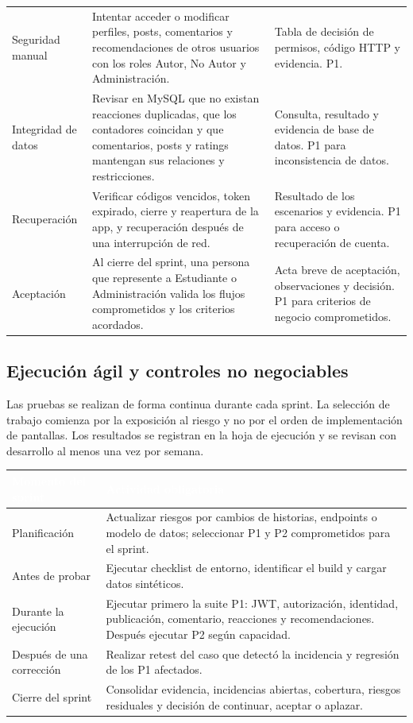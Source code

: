 \documentclass[11pt,a4paper]{article}
\newcommand{\thead}[1]{\textcolor{white}{\textbf{#1}}}
\begin{document}
\begin{longtable}{p{3.0cm}p{7.0cm}p{5.0cm}}
Seguridad manual & Intentar acceder o modificar perfiles, posts, comentarios y recomendaciones de otros usuarios con los roles Autor, No Autor y Administración. & Tabla de decisión de permisos, código HTTP y evidencia. P1.\\
\rowcolor{lightgray}Integridad de datos & Revisar en MySQL que no existan reacciones duplicadas, que los contadores coincidan y que comentarios, posts y ratings mantengan sus relaciones y restricciones. & Consulta, resultado y evidencia de base de datos. P1 para inconsistencia de datos.\\
Recuperación & Verificar códigos vencidos, token expirado, cierre y reapertura de la app, y recuperación después de una interrupción de red. & Resultado de los escenarios y evidencia. P1 para acceso o recuperación de cuenta.\\
\rowcolor{lightgray}Aceptación & Al cierre del sprint, una persona que represente a Estudiante o Administración valida los flujos comprometidos y los criterios acordados. & Acta breve de aceptación, observaciones y decisión. P1 para criterios de negocio comprometidos.\\
\end{longtable}

\subsection{Ejecución ágil y controles no negociables}
Las pruebas se realizan de forma continua durante cada sprint. La selección de trabajo comienza por la exposición al riesgo y no por el orden de implementación de pantallas. Los resultados se registran en la hoja de ejecución y se revisan con desarrollo al menos una vez por semana.

\begin{tabularx}{\textwidth}{p{3.0cm}Y}
\thead{Momento del sprint} & \thead{Actividad obligatoria}\\
\midrule
Planificación & Actualizar riesgos por cambios de historias, endpoints o modelo de datos; seleccionar P1 y P2 comprometidos para el sprint.\\
Antes de probar & Ejecutar checklist de entorno, identificar el build y cargar datos sintéticos.\\
Durante la ejecución & Ejecutar primero la suite P1: JWT, autorización, identidad, publicación, comentario, reacciones y recomendaciones. Después ejecutar P2 según capacidad.\\
Después de una corrección & Realizar retest del caso que detectó la incidencia y regresión de los P1 afectados.\\
Cierre del sprint & Consolidar evidencia, incidencias abiertas, cobertura, riesgos residuales y decisión de continuar, aceptar o aplazar.\\
\end{tabularx}
\end{document}
